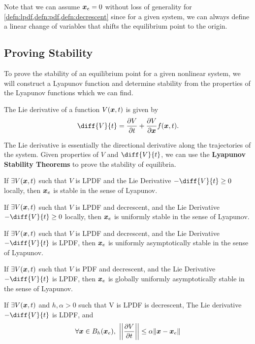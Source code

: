Note that we can assume $\boldsymbol{x}_e = 0$ without loss of generality for
\cref{defn:lpdf,defn:pdf,defn:decrescent} since for a given system, we can always define a linear
change of variables that shifts the equilibrium point to the origin.

\subsection{Proving Stability}
To prove the stability of an equilibrium point for a given nonlinear system, we
will construct a Lyapunov function and determine stability from the properties
of the Lyapunov functions which we can find.
\begin{definition}
	The Lie derivative of a function $V(\boldsymbol{x}, t)$ is given by \[
		\diff{V}{t} = \frac{\partial V}{\partial t}  +
		\frac{\partial V}{\partial \bs{x}}f(\bs{x}, t).
	\]
	\label{defn:lie-derivative}
\end{definition}
The Lie derivative is essentially the directional derivative along the
trajectories of the system.
Given properties of $V$ and $\diff{V}{t}$, we can use the \textbf{Lyapunov
Stability Theorems} to prove the stability of equilibria.
\begin{theorem}
	If $\exists V(\boldsymbol{x}, t)$ such that $V$ is LPDF and the Lie Derivative
	$-\diff{V}{t} \geq 0$ locally, then $\boldsymbol{x}_e$ is stable in the sense of
	Lyapunov.
	\label{thm:lyapunov-sisl}
\end{theorem}
\begin{theorem}
	If $\exists V(\boldsymbol{x}, t)$ such that $V$ is LPDF and decrescent, and the Lie Derivative
	$-\diff{V}{t} \geq 0$ locally, then $\boldsymbol{x}_e$ is uniformly stable in the sense of
	Lyapunov.
	\label{thm:lyapunov-uniformly-sisl}
\end{theorem}
\begin{theorem}
	If $\exists V(\boldsymbol{x}, t)$ such that $V$ is LPDF and decrescent, and the Lie Derivative
	$-\diff{V}{t}$ is LPDF, then $\boldsymbol{x}_e$ is uniformly asymptotically stable in the sense of
	Lyapunov.
	\label{thm:lyapunov-uniformly-as}
\end{theorem}
\begin{theorem}
	If $\exists V(\boldsymbol{x}, t)$ such that $V$ is PDF and decrescent, and the Lie Derivative
	$-\diff{V}{t}$ is LPDF, then $\boldsymbol{x}_e$ is globally uniformly asymptotically stable in the sense of
	Lyapunov.
	\label{thm:lyapunov-globally-as}
\end{theorem}
\begin{theorem}
	If $\exists V(\boldsymbol{x}, t)$ and $h, \alpha > 0$ such that V is LPDF is
	decrescent, The Lie derivative $-\diff{V}{t}$ is LDPF, and \[
		\forall \bs{x}\in B_h(\bs{x}_e),\ \left\lvert\left\lvert\frac{\partial
		V}{\partial t}\right\rvert\right\rvert \leq \alpha \|\bs{x}-\bs{x}_e\|
	\]
	\label{thm:lyapunov-exponential-stability}
\end{theorem}
